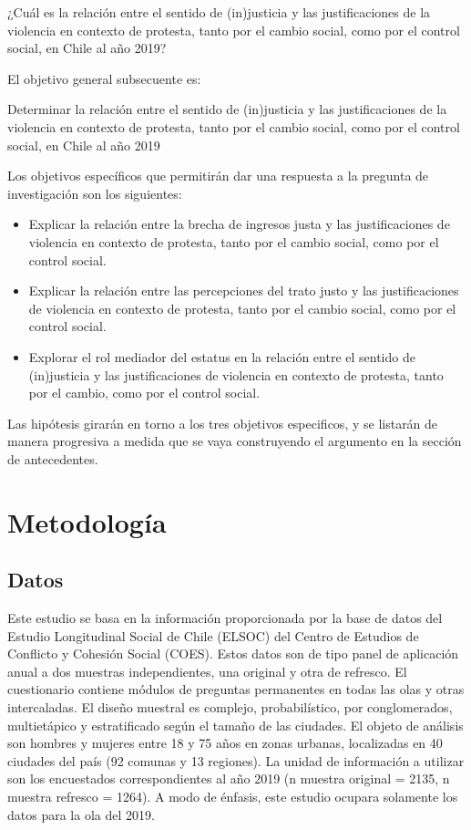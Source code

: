 \documentclass[12pt,twoside]{templates/facsothesis}
\begin{document}
¿Cuál es la relación entre el sentido de (in)justicia y las justificaciones de la violencia en contexto de protesta, tanto por el cambio social, como por el control social, en Chile al año 2019?

El objetivo general subsecuente es:

Determinar la relación entre el sentido de (in)justicia y las justificaciones de la violencia en contexto de protesta, tanto por el cambio social, como por el control social, en Chile al año 2019

Los objetivos específicos que permitirán dar una respuesta a la pregunta de investigación son los siguientes:

\begin{itemize}
\item
  Explicar la relación entre la brecha de ingresos justa y las justificaciones de violencia en contexto de protesta, tanto por el cambio social, como por el control social.
\item
  Explicar la relación entre las percepciones del trato justo y las justificaciones de violencia en contexto de protesta, tanto por el cambio social, como por el control social.
\item
  Explorar el rol mediador del estatus en la relación entre el sentido de (in)justicia y las justificaciones de violencia en contexto de protesta, tanto por el cambio, como por el control social.
\end{itemize}

Las hipótesis girarán en torno a los tres objetivos especificos, y se listarán de manera progresiva a medida que se vaya construyendo el argumento en la sección de antecedentes.

\hypertarget{metodologuxeda}{%
\chapter{Metodología}\label{metodologuxeda}}

\hypertarget{datos}{%
\section{Datos}\label{datos}}

Este estudio se basa en la información proporcionada por la base de datos del Estudio Longitudinal Social de Chile (ELSOC) del Centro de Estudios de Conflicto y Cohesión Social (COES). Estos datos son de tipo panel de aplicación anual a dos muestras independientes, una original y otra de refresco. El cuestionario contiene módulos de preguntas permanentes en todas las olas y otras intercaladas. El diseño muestral es complejo, probabilístico, por conglomerados, multietápico y estratificado según el tamaño de las ciudades. El objeto de análisis son hombres y mujeres entre 18 y 75 años en zonas urbanas, localizadas en 40 ciudades del país (92 comunas y 13 regiones). La unidad de información a utilizar son los encuestados correspondientes al año 2019 (n muestra original = 2135, n muestra refresco = 1264). A modo de énfasis, este estudio ocupara solamente los datos para la ola del 2019.
\end{document}
